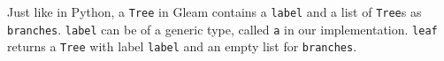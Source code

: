 \begin{blocksection}
Just like in Python, a \texttt{Tree} in Gleam contains a \texttt{label} and a list of \texttt{Tree}s as \texttt{branches}. \texttt{label} can be of a generic type, called \texttt{a} in our implementation. 
\texttt{leaf} returns a \texttt{Tree} with label \texttt{label} and an empty list for \texttt{branches}.
\end{blocksection}